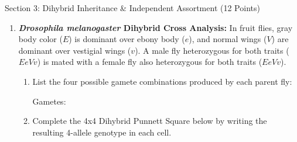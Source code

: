 \documentclass[10pt,a4paper]{scrartcl}
\begin{document}
\newpage

\begin{sectionbox}{Section 3: Dihybrid Inheritance \& Independent Assortment (12 Points)}
\begin{enumerate}
  \item \textbf{\textit{Drosophila melanogaster} Dihybrid Cross Analysis:}
  In fruit flies, gray body color ($E$) is dominant over ebony body ($e$), and normal wings ($V$) are dominant over vestigial wings ($v$). A male fly heterozygous for both traits ($EeVv$) is mated with a female fly also heterozygous for both traits ($EeVv$).

  \begin{enumerate}
    \item List the four possible gamete combinations produced by each parent fly:
    \begin{center}
      Gametes: \quad {} \quad {} \quad {} \quad {}
    \end{center}
    \item Complete the 4x4 Dihybrid Punnett Square below by writing the resulting 4-allele genotype in each cell.
  \end{enumerate}

  \vspace{1pt}
  \begin{center}
  \begin{tcolorbox}[colback=white, colframe=TealDark, boxrule=1pt, title={\centering\sffamily\bfseries Dihybrid Cross Grid ($EeVv \times EeVv$)}, coltitle=white, width=0.82\textwidth, top=1pt, bottom=1pt]
    \centering
    \vspace{1pt}
\end{tcolorbox}
\end{center}
\end{enumerate}
\end{sectionbox}
\end{document}
